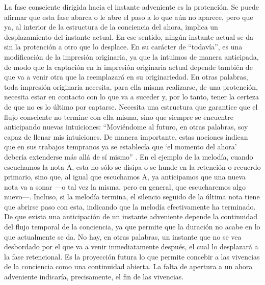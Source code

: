 La fase consciente dirigida hacia el instante adveniente es la
protención. Se puede afirmar que esta fase abarca o le abre el paso a lo
que aún no aparece, pero que ya, al interior de la estructura de la
conciencia del ahora, implica un desplazamiento del instante actual. En
ese sentido, ningún instante actual se da sin la protención a otro que
lo desplace. En su carácter de ``todavía'', es una modificación de la
impresión originaria, ya que la intuimos de manera anticipada, de modo
que la captación en la impresión originaria actual depende también de
que va a venir otra que la reemplazará en su originariedad. En otras
palabras, toda impresión originaria necesita, para ella misma
realizarse, de una protención, necesita estar en contacto con lo que va
a suceder y, por lo tanto, tener la certeza de que no es lo último por
captarse. Necesita una estructura que garantice que el flujo consciente
no termine con ella misma, sino que siempre se encuentre anticipando
nuevas intuiciones: ``Moviéndome al futuro, en otras palabras, soy capaz
de llenar mis intuiciones. De manera importante, estas nociones indican
que en sus trabajos tempranos ya se establecía que `el momento del
ahora' debería extenderse más allá de sí mismo'' \cite[p.~131]{rodemeyer2003}.
En el ejemplo de la melodía, cuando escuchamos la nota A, esta no sólo
se disipa o se hunde en la retención o recuerdo primario, sino que, al
igual que escuchamos A, ya anticipamos que una nueva nota va a sonar
---o tal vez la misma, pero en general, que escucharemos algo nuevo---.
Incluso, si la melodía termina, el silencio seguido de la última nota
tiene que abrirse paso con esta, indicando que la melodía efectivamente
ha terminado. De que exista una anticipación de un instante adveniente
depende la continuidad del flujo temporal de la conciencia, ya que
permite que la duración no acabe en lo que actualmente se da. No hay, en
otras palabras, un instante que no se vea desbordado por el que va a
venir inmediatamente después, el cual lo desplazará a la fase
retencional. Es la proyección futura lo que permite concebir a las
vivencias de la conciencia como una continuidad abierta. La falta de
apertura a un ahora adveniente indicaría, precisamente, el fin de las
vivencias.

